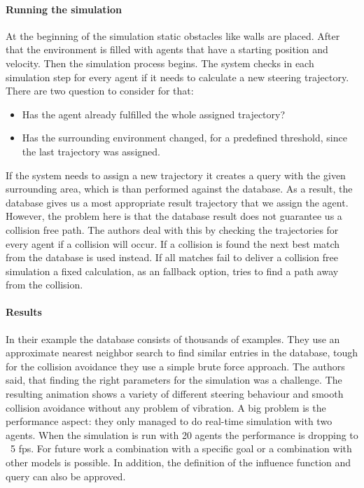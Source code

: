\documentclass{acmsiggraph}               %
\begin{document}
\paragraph{Running the simulation}
At the beginning of the simulation static obstacles like walls are placed. After that the environment is filled with agents that have a starting position and velocity. Then the simulation process begins.
The system checks in each simulation step for every agent if it needs to calculate a new steering trajectory. There are two question to consider for that: 
\begin{itemize}
    \item Has the agent already fulfilled the whole assigned trajectory?
    \item Has the surrounding environment changed, for a predefined threshold, since the last trajectory was assigned.
\end{itemize}
If the system needs to assign a new trajectory it creates a query with the given surrounding area, which is than performed against the database. As a result, the database gives us a most appropriate result trajectory that we assign the agent. 
However, the problem here is that the database result does not guarantee us a collision free path. The authors deal with this by checking the trajectories for every agent if a collision will occur. If a collision is found the next best match from the database is used instead. If all matches fail to deliver a collision free simulation a fixed calculation, as an fallback option, tries to find a path away from the collision. 

\paragraph{Results}
In their example the database consists of thousands of examples. They use an approximate nearest neighbor search to find similar entries in the database, tough for the collision avoidance they use a simple brute force approach. The authors said, that finding the right parameters for the simulation was a challenge.
The resulting animation shows a variety of different steering behaviour and smooth collision avoidance without any problem of vibration.  
A big problem is the performance aspect: they only managed to do real-time simulation with two agents. When the simulation is run with 20 agents the performance is dropping to ~5 fps. 
For future work a combination with a specific goal or a combination with other models is possible. In addition, the definition of the influence function and query can also be approved.
\end{document}
